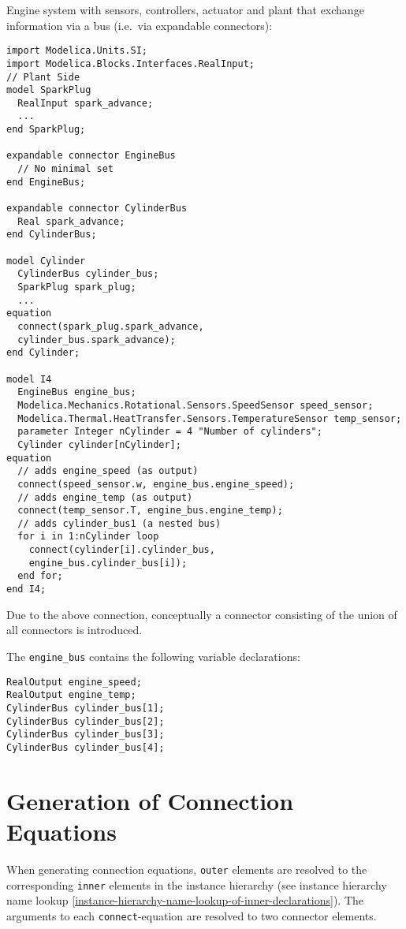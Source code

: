 \begin{example}
Engine system with sensors, controllers, actuator and plant that
exchange information via a bus (i.e.\ via expandable connectors):
\begin{lstlisting}[language=modelica]
import Modelica.Units.SI;
import Modelica.Blocks.Interfaces.RealInput;
// Plant Side
model SparkPlug
  RealInput spark_advance;
  ...
end SparkPlug;

expandable connector EngineBus
  // No minimal set
end EngineBus;

expandable connector CylinderBus
  Real spark_advance;
end CylinderBus;

model Cylinder
  CylinderBus cylinder_bus;
  SparkPlug spark_plug;
  ...
equation
  connect(spark_plug.spark_advance,
  cylinder_bus.spark_advance);
end Cylinder;

model I4
  EngineBus engine_bus;
  Modelica.Mechanics.Rotational.Sensors.SpeedSensor speed_sensor;
  Modelica.Thermal.HeatTransfer.Sensors.TemperatureSensor temp_sensor;
  parameter Integer nCylinder = 4 "Number of cylinders";
  Cylinder cylinder[nCylinder];
equation
  // adds engine_speed (as output)
  connect(speed_sensor.w, engine_bus.engine_speed);
  // adds engine_temp (as output)
  connect(temp_sensor.T, engine_bus.engine_temp);
  // adds cylinder_bus1 (a nested bus)
  for i in 1:nCylinder loop
    connect(cylinder[i].cylinder_bus,
    engine_bus.cylinder_bus[i]);
  end for;
end I4;
\end{lstlisting}
Due to the above connection, conceptually a connector consisting
of the union of all connectors is introduced.

The \lstinline!engine_bus! contains the following variable declarations:
\begin{lstlisting}[language=modelica]
RealOutput engine_speed;
RealOutput engine_temp;
CylinderBus cylinder_bus[1];
CylinderBus cylinder_bus[2];
CylinderBus cylinder_bus[3];
CylinderBus cylinder_bus[4];
\end{lstlisting}
\end{example}

\section{Generation of Connection Equations}

When generating connection equations, \lstinline!outer! elements are resolved to the
corresponding \lstinline!inner! elements in the instance hierarchy (see instance
hierarchy name lookup \autoref{instance-hierarchy-name-lookup-of-inner-declarations}). The arguments to each \lstinline!connect!-equation are
resolved to two connector elements.

